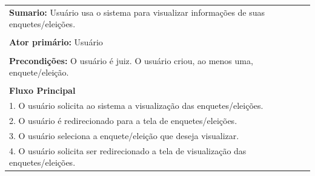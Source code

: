 \documentclass[a4paper,12pt]{article}
\begin{document}
\markright{}
\begin{tabular}{|l|}\hline
	{\textbf{Sumario:}} Usuário usa o sistema para visualizar informações de suas enquetes/eleições.\ \ \ \ \ \ \ \ \ \\\\
	{\textbf{Ator primário:}} Usuário \\\\
	{\textbf{Precondições:}} O usuário é juiz. O usuário criou, ao menos uma, enquete/eleição.\\\\
	{\textbf{Fluxo Principal}}\\
	1. O usuário solicita ao sistema a visualização das enquetes/eleições.\\
	2. O usuário é redirecionado para a tela de enquetes/eleições. \\
	3. O usuário seleciona a enquete/eleição que deseja visualizar. \\
	4. O usuário solicita ser redirecionado a tela de visualização das enquetes/eleições.\\
	\hline
\end{tabular}
\end{document}
